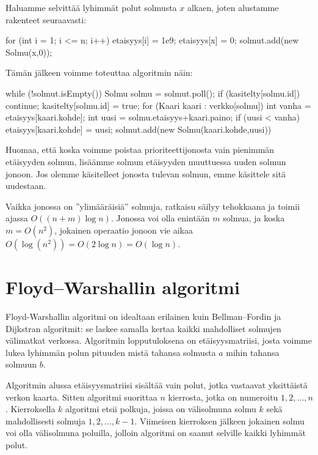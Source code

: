 Haluamme selvittää lyhimmät polut solmusta $x$ alkaen,
joten alustamme rakenteet seuraavasti:

\begin{code}
for (int i = 1; i <= n; i++) {
    etaisyys[i] = 1e9;
}
etaisyys[x] = 0;
solmut.add(new Solmu(x,0));
\end{code}

Tämän jälkeen voimme toteuttaa algoritmin näin:

\begin{code}
while (!solmut.isEmpty()) {
    Solmu solmu = solmut.poll();
    if (kasitelty[solmu.id]) continue;
    kasitelty[solmu.id] = true;
    for (Kaari kaari : verkko[solmu]) {
        int vanha = etaisyys[kaari.kohde];
        int uusi = solmu.etaisyys+kaari.paino;
        if (uusi < vanha) {
            etaisyys[kaari.kohde] = uusi;
            solmut.add(new Solmu(kaari.kohde,uusi))
        }
    }
}
\end{code}

Huomaa, että koska voimme poistaa prioriteettijonosta
vain pienimmän etäisyyden solmun,
lisäämme solmun etäisyyden muuttuessa uuden solmun jonoon.
Jos olemme käsitelleet jonosta tulevan solmun,
emme käsittele sitä uudestaan.

Vaikka jonossa on ''ylimääräisiä'' solmuja, ratkaisu säilyy
tehokkaana ja toimii ajassa $O((n+m) \log n)$.
Jonossa voi olla enintään $m$ solmua, ja koska $m=O(n^2)$,
jokainen operaatio jonoon vie aikaa $O(\log (n^2))=O(2 \log n)=O(\log n)$.

\section{Floyd–Warshallin algoritmi}

Floyd-Warshallin algoritmi on idealtaan erilainen kuin
Bellman–Fordin ja Dijkstran algoritmit:
se laskee samalla kertaa kaikki mahdolliset
solmujen välimatkat verkossa.
Algoritmin lopputuloksena on etäisyysmatriisi,
josta voimme lukea lyhimmän polun pituuden mistä tahansa solmusta $a$
mihin tahansa solmuun $b$.

Algoritmin alussa etäisyysmatriisi sisältää vain polut,
jotka vastaavat yksittäistä verkon kaarta.
Sitten algoritmi suorittaa $n$ kierrosta,
jotka on numeroitu $1,2,\dots,n$.
Kierroksella $k$ algoritmi etsii polkuja, joissa on välisolmuna
solmu $k$ sekä mahdollisesti solmuja $1,2,\dots,k-1$.
Viimeisen kierroksen jälkeen jokainen solmu voi olla
välisolmuna poluilla, jolloin algoritmi on saanut selville
kaikki lyhimmät polut.

